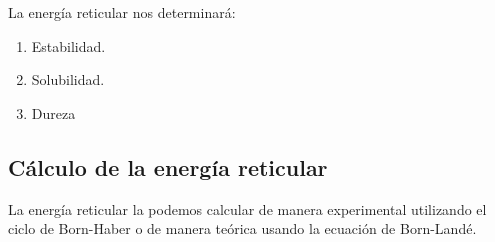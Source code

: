 La energía reticular nos determinará:
\begin{enumerate}[label=\letraminuscula]
        \item Estabilidad.
        \item Solubilidad.
        \item Dureza
\end{enumerate}

\subsection{Cálculo de la energía reticular}\label{subsec:calculo-de-la-energia-reticular}

La energía reticular la podemos calcular de manera experimental utilizando el ciclo de Born-Haber o de manera teórica usando la ecuación de Born-Landé.

